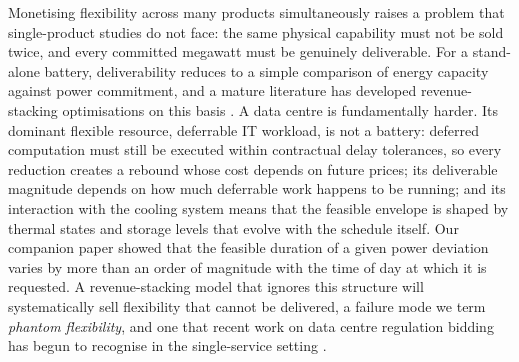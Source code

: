 \documentclass[lettersize,journal]{IEEEtran}
\begin{document}
Monetising flexibility across many products simultaneously raises a problem that single-product studies do not face: the same physical capability must not be sold twice, and every committed megawatt must be genuinely deliverable. For a stand-alone battery, deliverability reduces to a simple comparison of energy capacity against power commitment, and a mature literature has developed revenue-stacking optimisations on this basis \cite{staffell2016maximising,seward2022revenue,pusceddu2021synergies,mohamed2023stacked}. A data centre is fundamentally harder. Its dominant flexible resource, deferrable IT workload, is not a battery: deferred computation must still be executed within contractual delay tolerances, so every reduction creates a rebound whose cost depends on future prices; its deliverable magnitude depends on how much deferrable work happens to be running; and its interaction with the cooling system means that the feasible envelope is shaped by thermal states and storage levels that evolve with the schedule itself. Our companion paper \cite{takci2026characterisation} showed that the feasible duration of a given power deviation varies by more than an order of magnitude with the time of day at which it is requested. A revenue-stacking model that ignores this structure will systematically sell flexibility that cannot be delivered, a failure mode we term \emph{phantom flexibility}, and one that recent work on data centre regulation bidding has begun to recognise in the single-service setting \cite{fan2026harnessing}.
\end{document}
